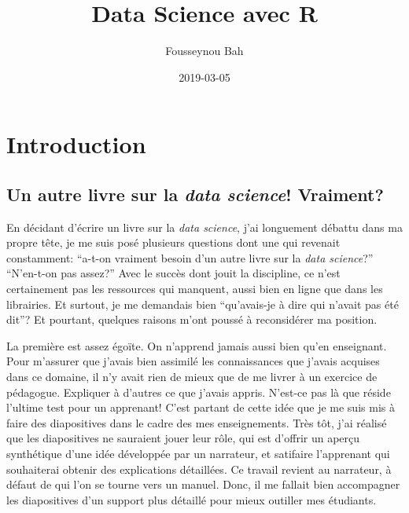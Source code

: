 \documentclass[]{book}
\title{Data Science avec R}
\author{Fousseynou Bah}
\date{2019-03-05}
\begin{document}
\maketitle

{
\hypersetup{linkcolor=black}
\setcounter{tocdepth}{1}
\tableofcontents
}
\chapter{Introduction}\label{introduction}

\section{\texorpdfstring{Un autre livre sur la \emph{data science}!
Vraiment?}{Un autre livre sur la data science! Vraiment?}}\label{un-autre-livre-sur-la-data-science-vraiment}

En décidant d'écrire un livre sur la \emph{data science}, j'ai
longuement débattu dans ma propre tête, je me suis posé plusieurs
questions dont une qui revenait constamment: ``a-t-on vraiment besoin
d'un autre livre sur la \emph{data science}?'' ``N'en-t-on pas assez?''
Avec le succès dont jouit la discipline, ce n'est certainement pas les
ressources qui manquent, aussi bien en ligne que dans les librairies. Et
surtout, je me demandais bien ``qu'avais-je à dire qui n'avait pas été
dit''? Et pourtant, quelques raisons m'ont poussé à reconsidérer ma
position.

La première est assez égoïte. On n'apprend jamais aussi bien qu'en
enseignant. Pour m'assurer que j'avais bien assimilé les connaissances
que j'avais acquises dans ce domaine, il n'y avait rien de mieux que de
me livrer à un exercice de pédagogue. Expliquer à d'autres ce que
j'avais appris. N'est-ce pas là que réside l'ultime test pour un
apprenant! C'est partant de cette idée que je me suis mis à faire des
diapositives dans le cadre des mes enseignements. Très tôt, j'ai réalisé
que les diapositives ne sauraient jouer leur rôle, qui est d'offrir un
aperçu synthétique d'une idée développée par un narrateur, et satifaire
l'apprenant qui souhaiterai obtenir des explications détaillées. Ce
travail revient au narrateur, à défaut de qui l'on se tourne vers un
manuel. Donc, il me fallait bien accompagner les diapositives d'un
support plus détaillé pour mieux outiller mes étudiants.
\end{document}
